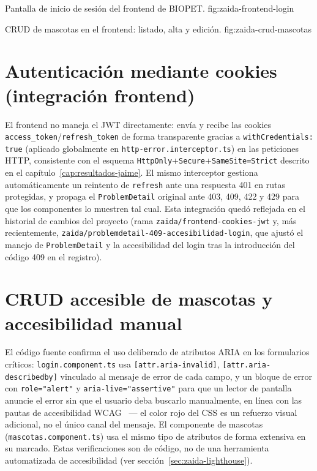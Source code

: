 %
{Pantalla de inicio de sesi\'on del frontend de BIOPET.}%
{fig:zaida-frontend-login}

%
{CRUD de mascotas en el frontend: listado, alta y edici\'on.}%
{fig:zaida-crud-mascotas}

\section{Autenticaci\'on mediante cookies (integraci\'on frontend)}

El frontend no maneja el JWT directamente: env\'ia y recibe las cookies
\texttt{access\_token}/\texttt{refresh\_token} de forma transparente gracias
a \texttt{withCredentials: true} (aplicado globalmente en
\texttt{http-error.interceptor.ts}) en las peticiones HTTP, consistente con
el esquema \texttt{HttpOnly}+\texttt{Secure}+\texttt{SameSite=Strict}
descrito en el cap\'itulo~\ref{cap:resultados-jaime}. El mismo interceptor
gestiona autom\'aticamente un reintento de \texttt{refresh} ante una
respuesta 401 en rutas protegidas, y propaga el \texttt{ProblemDetail}
original ante 403, 409, 422 y 429 para que los componentes lo muestren tal
cual. Esta integraci\'on qued\'o reflejada en el historial de cambios del
proyecto (rama \texttt{zaida/frontend-cookies-jwt} y, m\'as recientemente,
\texttt{zaida/problemdetail-409-accesibilidad-login}, que ajust\'o el
manejo de \texttt{ProblemDetail} y la accesibilidad del login tras la
introducci\'on del c\'odigo 409 en el registro).

\section{CRUD accesible de mascotas y accesibilidad manual}

El c\'odigo fuente confirma el uso deliberado de atributos ARIA en los
formularios cr\'iticos: \texttt{login.component.ts} usa
\texttt{[attr.aria-invalid]}, \texttt{[attr.aria-describedby]} vinculado al
mensaje de error de cada campo, y un bloque de error con
\texttt{role="alert"} y \texttt{aria-live="assertive"} para que un lector
de pantalla anuncie el error sin que el usuario deba buscarlo
manualmente, en l\'inea con las pautas de accesibilidad WCAG~\cite{wcag21}
--- el color rojo del CSS es un refuerzo visual adicional, no
el \'unico canal del mensaje. El componente de mascotas
(\texttt{mascotas.component.ts}) usa el mismo tipo de atributos de forma
extensiva en su marcado. Estas verificaciones son de c\'odigo, no de una
herramienta automatizada de accesibilidad (ver secci\'on~\ref{sec:zaida-lighthouse}).

